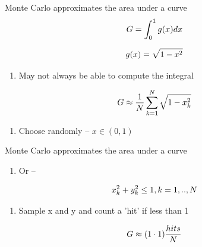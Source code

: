 \documentclass[aspectratio=1610,pdftex,dvipsnames,compress,xcolor={dvipsnames}]{beamer}
\begin{document}
\addtocounter{framenumber}{-1} 
\begin{frame}{Monte Carlo approximates the area under a curve}
    \begin{equation}
        \LARGE
        G = \int_0^1 g(x)dx
    \end{equation}

    \begin{equation}
        \LARGE
        g(x) = \sqrt{1-x^2}
    \end{equation}

    \vspace*{\fill}

    \begin{enumerate}[series=outerlist,topsep=0pt,itemsep=21pt,leftmargin=*,label=(\arabic*)]
        \item[]May not always be able to compute the integral
    \end{enumerate}

    \vspace*{\fill}

    \begin{equation}
        \LARGE
        G \approx \frac{1}{N} \sum_{k=1}^{N} \sqrt{1-x_k^2}
    \end{equation}

    \vspace*{\fill}

    \begin{enumerate}[series=outerlist,topsep=0pt,itemsep=21pt,leftmargin=*,label=(\arabic*)]
        \item[]Choose randomly -- $x \in (0,1)$
    \end{enumerate}
\end{frame}


\begin{frame}{Monte Carlo approximates the area under a curve}
    \begin{enumerate}[series=outerlist,topsep=0pt,itemsep=21pt,leftmargin=*,label=(\arabic*)]
        \item[]Or --
    \end{enumerate}

    \vspace*{\fill}

    \begin{equation}
        \LARGE
        x_k^2+y_k^2 \leq 1, k = 1,..,N
    \end{equation}

    \vspace*{\fill}

    \begin{enumerate}[series=outerlist,topsep=0pt,itemsep=11pt,leftmargin=*,label=(\arabic*)]
        \item[]Sample x and y and count a 'hit' if less than 1
    \end{enumerate}

    \vspace*{\fill}

    \begin{equation}
        \LARGE
        G \approx (1 \cdot 1)\frac{hits}{N}
    \end{equation}
\end{frame}
\end{document}
